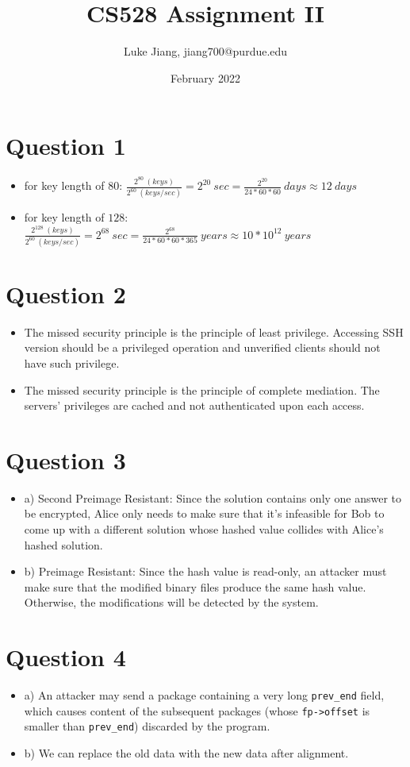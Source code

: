 \documentclass{article}
\title{CS528 Assignment II}
\author{Luke Jiang, jiang700@purdue.edu }
\date{February 2022}
\begin{document}
\maketitle

\section{Question 1}
\begin{itemize}
    \item for key length of $80$: $\frac{2^{80}~(keys)}{2^{60}~(keys/sec)} = 2^{20}~sec = \frac{2^{20}}{24*60*60}~days \approx 12~days$
    \item for key length of $128$: $\frac{2^{128}~(keys)}{2^{60}~(keys/sec)} = 2^{68}~sec = \frac{2^{68}}{24*60*60*365}~years \approx 10*10^{12}~years$
\end{itemize}
\newpage

\section{Question 2}
\begin{itemize}
    \item The missed security principle is the principle of least privilege. Accessing SSH version should be a privileged operation and unverified clients should not have such privilege.
    \item The missed security principle is the principle of complete mediation. The servers' privileges are cached and not authenticated upon each access.
\end{itemize}
\newpage

\section{Question 3}
\begin{itemize}
    \item a) Second Preimage Resistant: Since the solution contains only one answer to be encrypted, Alice only needs to make sure that it's infeasible for Bob to come up with a different solution whose hashed value collides with Alice's hashed solution.
    \item b) Preimage Resistant: Since the hash value is read-only, an attacker must make sure that the modified binary files produce the same hash value. Otherwise, the modifications will be detected by the system.
\end{itemize}
\newpage

\section{Question 4}
\begin{itemize}
    \item a) An attacker may send a package containing a very long \verb|prev_end| field, which causes content of the subsequent packages (whose \verb|fp->offset| is smaller than \verb|prev_end|) discarded by the program.
    \item b) We can replace the old data with the new data after alignment.
\end{itemize}
\newpage
\end{document}
